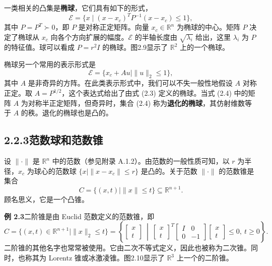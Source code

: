 \documentclass[UTF8,12pt,a4paper,fontset=fandol]{ctexart}
\begin{document}
一类相关的凸集是\textbf{椭球}，它们具有如下的形式，
\begin{equation}
  \mathcal{E}=\{x\mid (x-x_c)^TP^{-1}(x-x_c)\le 1\},
  \tag{2.3}
\end{equation}
其中 $P=P^T\succ 0$，即 $P$ 是对称正定矩阵。向量 $x_c\in\mathbb{R}^n$ 为椭球的中心。矩阵 $P$ 决定了椭球从 $x_c$ 向各个方向扩展的幅度。$\mathcal{E}$ 的半轴长度由 $\sqrt{\lambda_i}$ 给出，这里 $\lambda_i$ 为 $P$ 的特征值。球可以看成 $P=r^2I$ 的椭球。图2.9显示了 $\mathbb{R}^2$ 上的一个椭球。

椭球另一个常用的表示形式是
\begin{equation}
  \mathcal{E}=\{x_c+Au\mid \|u\|_2\le 1\},
  \tag{2.4}
\end{equation}
其中 $A$ 是非奇异的方阵。在此类表示形式中，我们可以不失一般性地假设 $A$ 对称正定。取 $A=P^{1/2}$，这个表达式给出了由式 (2.3) 定义的椭球。当式 (2.4) 中的矩阵 $A$ 为对称半正定矩阵，但奇异时，集合 (2.4) 称为\textbf{退化的椭球}，其仿射维数等于 $A$ 的秩。退化的椭球也是凸的。

\subsection*{2.2.3\quad 范数球和范数锥}

设 $\|\cdot\|$ 是 $\mathbb{R}^n$ 中的范数（参见附录 A.1.2）。由范数的一般性质可知，以 $r$ 为半径，$x_c$ 为球心的范数球 $\{x\mid \|x-x_c\|\le r\}$ 是凸的。关于范数 $\|\cdot\|$ 的范数锥是集合
\[
  C=\{(x,t)\mid \|x\|\le t\}\subseteq\mathbb{R}^{n+1}.
\]
顾名思义，它是一个凸锥。

\noindent\textbf{例 2.3}\quad 二阶锥是由 Euclid 范数定义的范数锥，即
\[
  C=\{(x,t)\in\mathbb{R}^{n+1}\mid \|x\|_2\le t\}
  =
  \left\{
  \begin{bmatrix} x\\ t \end{bmatrix}
  \ \middle|\
  \begin{bmatrix} x\\ t \end{bmatrix}^{T}
  \begin{bmatrix} I & 0\\ 0 & -1 \end{bmatrix}
  \begin{bmatrix} x\\ t \end{bmatrix}
  \le 0,\ t\ge 0
  \right\}.
\]
二阶锥的其他名字也常常被使用。它由二次不等式定义，因此也被称为二次锥。同时，也称其为 Lorentz 锥或冰激凌锥。图2.10显示了 $\mathbb{R}^3$ 上一个的二阶锥。
\end{document}
